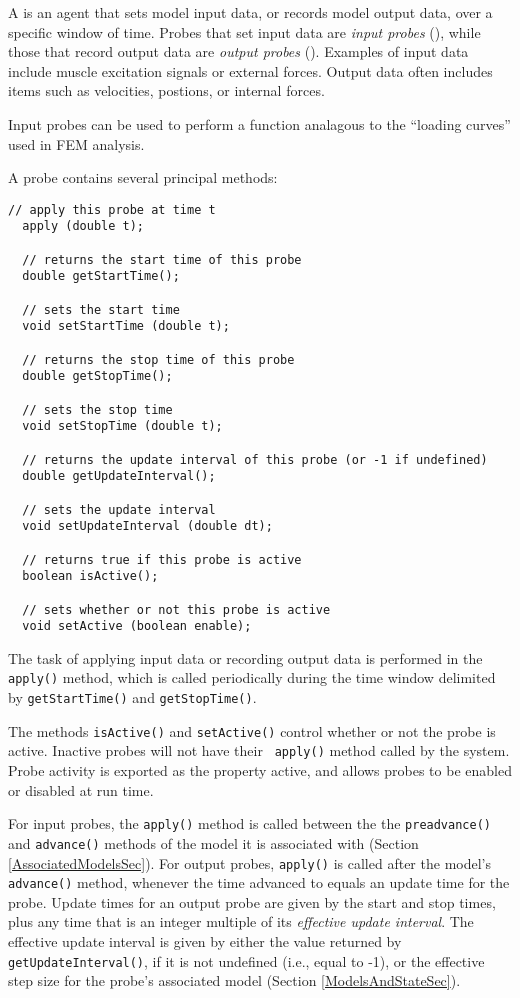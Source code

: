 \documentclass{article}
\begin{document}
A  is an agent that sets model
input data, or records model output data, over a specific window of
time. Probes that set input data are {\it input probes}
(), while those that
record output data are {\it output probes}
(). Examples of input
data include muscle excitation signals or external forces. Output data
often includes items such as velocities, postions, or internal forces.

Input probes can be used to perform a function analagous to
the ``loading curves'' used in FEM analysis.

A probe contains several principal methods:
\begin{lstlisting}[]
  // apply this probe at time t
  apply (double t);

  // returns the start time of this probe
  double getStartTime();

  // sets the start time
  void setStartTime (double t);

  // returns the stop time of this probe
  double getStopTime();

  // sets the stop time
  void setStopTime (double t);

  // returns the update interval of this probe (or -1 if undefined) 
  double getUpdateInterval();

  // sets the update interval
  void setUpdateInterval (double dt);

  // returns true if this probe is active
  boolean isActive();

  // sets whether or not this probe is active
  void setActive (boolean enable);
\end{lstlisting}

The task of applying input data or recording output data is performed
in the {\tt apply()} method, which is called periodically during the time
window delimited by {\tt getStartTime()} and {\tt getStopTime()}. 

The methods {\tt isActive()} and {\tt setActive()} control whether or
not the probe is active. Inactive probes will not have their {\tt
apply()} method called by the system. Probe activity is exported as
the property {\sf active}, and allows probes to be enabled or disabled
at run time.

For input probes, the {\tt apply()} method is called between the the
{\tt preadvance()} and {\tt advance()} methods of the model it is
associated with (Section \ref{AssociatedModelsSec}).  For output
probes, {\tt apply()} is called after the model's {\tt advance()} method,
whenever the time advanced to equals an update time for the
probe. Update times for an output probe are given by the start and
stop times, plus any time that is an integer multiple of its {\it
effective update interval}. The effective update interval is given by
either the value returned by {\tt getUpdateInterval()}, if it is not
undefined (i.e., equal to -1), or the effective step size for the
probe's associated model (Section \ref{ModelsAndStateSec}).
\end{document}
